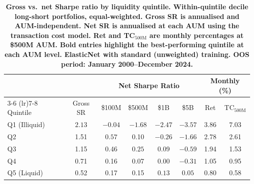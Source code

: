 \begin{table}[t!]
\centering
\begin{tabular}{l c cccc cc}
\midrule
& & \multicolumn{4}{c}{Net Sharpe Ratio} & \multicolumn{2}{c}{Monthly (\%)} \\
\cmidrule(lr){3-6} \cmidrule(lr){7-8}
Quintile & Gross SR & \$100M & \$500M & \$1B & \$5B & Ret & TC$_{500\text{M}}$ \\
\midrule
Q1 (Illiquid) & $\mathbf{2.13}$ & $-0.04$ & $\mathbf{-1.68}$ & $-2.47$ & $-3.57$ & 3.86 & $\mathbf{7.03}$ \\
Q2             & 1.51 & $\mathbf{0.57}$ & 0.10 & $-0.26$ & $-1.66$ & 2.78 & 2.61 \\
Q3             & 1.15 & 0.46 & $\mathbf{0.25}$ & 0.09 & $-0.59$ & 1.94 & 1.53 \\
Q4             & 0.71 & 0.16 & 0.07 & 0.00 & $-0.31$ & 1.05 & 0.95 \\
Q5 (Liquid)    & 0.52 & 0.17 & 0.15 & $\mathbf{0.13}$ & $\mathbf{0.05}$ & 0.80 & 0.58 \\
\midrule
\end{tabular}
\caption{\footnotesize \bf Gross vs.\ net Sharpe ratio by liquidity quintile\normalfont. Within-quintile decile long-short portfolios, equal-weighted. Gross SR is annualised and AUM-independent. Net SR is annualised at each AUM using the \citet{frazzini2018trading} transaction cost model. Ret and TC$_{500\text{M}}$ are monthly percentages at \$500M AUM. Bold entries highlight the best-performing quintile at each AUM level. ElasticNet with standard (unweighted) training. OOS period: January 2000--December 2024.}
\label{tab:gross_vs_net}
\end{table}
